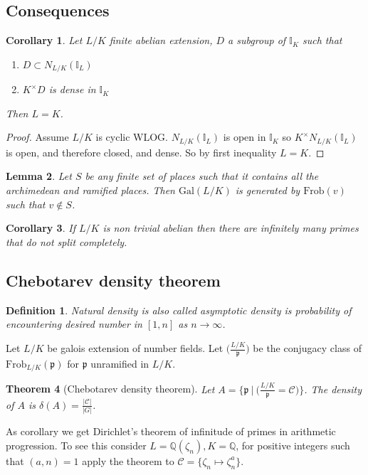 \documentclass[twoside, 12pt]{iiser-thesis}
\newtheorem{thm}{Theorem}[section]
\newtheorem{lem}[thm]{ Lemma}
\newtheorem{cor}[thm]{ Corollary}
\newtheorem{defi}{ Definition}[section]
\newcommand{\Q}{\mathbb{Q}}
\newcommand{\I}{\mathbb{I}}
\newcommand{\gal}{\text{Gal}}
\newcommand{\x}{\times}
\begin{document}
\subsection{Consequences}
\begin{cor}
Let $L/K$ finite abelian extension, $D$ a subgroup of $\I _K$ such that \begin{enumerate}
\item $D \subset N_{L/K} (\I _L)$
\item $K^\x D $ is dense in $\I _K$ 
\end{enumerate}
Then $L =K$.
\end{cor}
\begin{proof}
Assume $L/K$ is cyclic WLOG.
$N_{L/K}(\I _L)$ is open in $\I _K$ so $K^\x N_{L/K} (\I _L)$ is open, and therefore closed, and dense. So by first inequality $L=K$. 
\end{proof}



\begin{lem}
Let $S$ be any finite set of places such that it contains all the archimedean and ramified places. Then $\gal (L/K)$ is generated by $\text{Frob} (v)$ such that $v \not \in S$.
\end{lem}
\begin{cor}
If $L/K$ is non trivial abelian then there are infinitely many primes that do not split completely.
\end{cor}
\subsection{Chebotarev density theorem}
\begin{defi} Natural density is also called asymptotic density is probability of encountering desired number in $[1,n]$ as $n\rightarrow \infty$.
\end{defi}
Let $L/K$ be galois extension of number fields. Let $\big( \frac{L/K}{\mathfrak p} \big)$ be the conjugacy class of $\text{Frob}_{L/K} (\mathfrak p)$ for $\mathfrak p$ unramified in $L/K$. 
\begin{thm}[Chebotarev density theorem]
Let $A=\{ \mathfrak p \ | \ \big( \frac{L/K}{\mathfrak p} = \mathcal C \big) \}$. The density of $A$ is $\delta (A) = \frac{|\mathcal C| }{|G|} $.
\end{thm}
As corollary we get Dirichlet's theorem of infinitude of primes in arithmetic progression. To see this consider $L =\Q(\zeta _n) , K= \Q$, for positive integers such that $(a,n)=1$ apply the theorem to $\mathcal C = \{ \zeta _n \mapsto \zeta ^a _n \}$.









\end{document}
